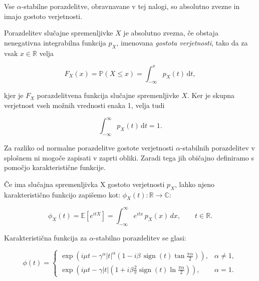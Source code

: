 \documentclass[a4paper, 12pt, openany]{book}
\begin{document}
Vse $\alpha$-stabilne porazdelitve, obravnavane v tej nalogi, so absolutno zvezne in imajo gostoto verjetnosti.

\begin{tcolorbox}[colback=blue!5!white,colframe=blue!50!black,title=Definicija 2: Absolutno zvezna porazdelitev]
\label{def:zvezna}
Porazdelitev slučajne spremenljivke $X$ je absolutno zvezna, če obstaja nenegativna integrabilna funkcija $p_X$, imenovana \emph{gostota verjetnosti}, tako da za vsak $x\in\mathbb{R}$ velja

\[
F_X(x)=\mathbb{P}(X\leq x)
=\int_{-\infty}^{x}p_X(t)\,\mathrm{d}t,
\]

kjer je $F_X$ porazdelitvena funkcija slučajne spremenljivke $X$. Ker je skupna verjetnost vseh možnih vrednosti enaka 1, velja tudi

\[
\int_{-\infty}^{\infty}p_X(t)\,\mathrm{d}t=1.
\]
\end{tcolorbox}

Za razliko od normalne porazdelitve gostote verjetnosti $\alpha$-stabilnih porazdelitev v splošnem ni mogoče zapisati v zaprti obliki. Zaradi tega jih običajno definiramo s pomočjo karakteristične funkcije.

\begin{tcolorbox}[colback=blue!5!white,colframe=blue!50!black,title=Definicija 3: Definicija karakteristične funkcije]
\label{def:karakteristicna}
Če ima slučajna spremenljivka X gostoto verjetnosti $p_{X}$, lahko njeno karakteristično funkcijo zapišemo kot:
$\phi_X(t): \mathbb{R} \rightarrow \mathbb{C}$:

\[
\phi_X(t)=\mathbb{E}\!\left[e^{itX}\right]
=\int_{-\infty}^{\infty} e^{itx}\,p_X(x)\,dx,
\qquad t\in\mathbb{R}.
\]
\end{tcolorbox}

Karakteristična funkcija za $\alpha$-stabilno porazdelitev se glasi:
\begin{tcolorbox}[colback=blue!5!white,colframe=blue!50!black,title=Definicija 4: Karakteristična funkcija $\alpha$-stabilne porazdelitve]
\[
\phi(t)=
\begin{cases}
\exp\!\left(
i\mu t
-\gamma^{\alpha}|t|^{\alpha}
\left(
1-i\beta\,\operatorname{sign}(t)\tan\frac{\pi\alpha}{2}
\right)
\right),
& \alpha \neq 1, \\[1.2em]
\exp\!\left(
i\mu t
-\gamma|t|
\left(
1+i\beta\frac{2}{\pi}\operatorname{sign}(t)\ln\frac{\pi\alpha}{2}
\right)
\right),
& \alpha = 1.
\end{cases}
\]
\label{def:karakteristicnaAlpha}
\end{tcolorbox}
\end{document}
